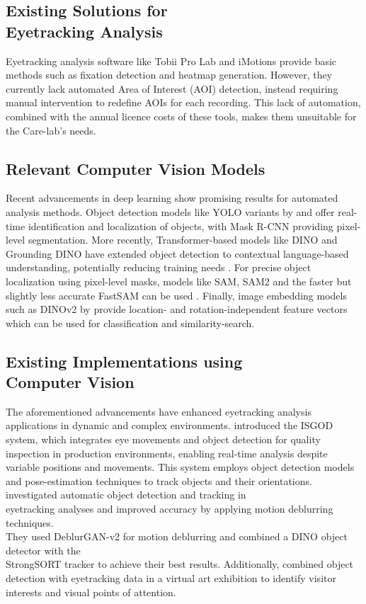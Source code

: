 \documentclass[english]{hogent-article}
\begin{document}
\subsection{Existing Solutions for\\ Eyetracking Analysis}

Eyetracking analysis software like Tobii Pro Lab \textcite{Tobii2025a} and iMotions \textcite{iMotions2025} provide basic methods such as fixation detection and heatmap generation.
However, they currently lack automated Area of Interest (AOI) detection, instead requiring manual intervention to redefine AOIs for each recording.
This lack of automation, combined with the annual licence costs of these tools, makes them unsuitable for the Care-lab's needs.

\subsection{Relevant Computer Vision Models}

Recent advancements in deep learning show promising results for automated analysis methods.
Object detection models like YOLO variants by \textcite{Redmon2016} and \textcite{Khanam2024} 
offer real-time identification and localization of objects, with Mask R-CNN \autocite{He2018} providing pixel-level segmentation.
More recently, Transformer-based models like DINO and Grounding DINO have extended object detection to 
contextual language-based understanding, potentially reducing training needs \autocite{Zhang2022, Liu2023}.
For precise object localization using pixel-level masks, models like SAM, SAM2 and the faster but slightly less 
accurate FastSAM can be used \autocite{Kirillov2023, Ravi2024, Zhao2023}.
Finally, image embedding models such as DINOv2 by \textcite{Oquab2024} provide location- 
and rotation-independent feature vectors which can be used for classification and similarity-search.

\subsection{Existing Implementations using\\ Computer Vision}

The aforementioned advancements have enhanced eyetracking analysis applications in dynamic and complex environments.
\textcite{Cho2024} introduced the ISGOD system, which integrates eye movements and object detection for quality inspection in production 
environments, enabling real-time analysis despite variable positions and movements. 
This system employs object detection models and pose-estimation techniques to track objects and their orientations.
\textcite{Cederin2023} investigated automatic object detection and tracking in\\ eyetracking analyses and improved accuracy by applying motion deblurring techniques.\\ 
They used DeblurGAN-v2 for motion deblurring and combined a DINO object detector with the\\ StrongSORT tracker to achieve their best results.
Additionally, \textcite{Kulyk2023} combined object detection with eyetracking data in a virtual art exhibition to identify visitor interests and visual points of attention.
\end{document}

